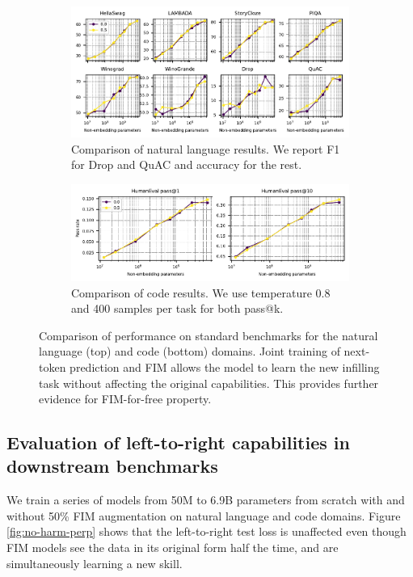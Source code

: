 \documentclass[postscript]{article}
\begin{document}
\begin{figure}[ht!]
\centering
\begin{subfigure}[b]{\textwidth}
\centering
\includegraphics[width=\textwidth]{figures/lang-downstream-eval.pdf}
\caption{Comparison of natural language results. We report F1 for Drop and QuAC and accuracy for the rest.}
\label{fig:no-harm-perf:lang}
\end{subfigure}
\begin{subfigure}[b]{\textwidth}
\centering
\includegraphics[width=\textwidth]{figures/human_eval_scaling_subf.pdf}
\caption{Comparison of code results. We use temperature 0.8 and 400 samples per task for both pass@k.}
\label{fig:no-harm-perf:code}
\end{subfigure}
\caption{Comparison of performance on standard benchmarks for the natural language (top) and code (bottom) domains. Joint training of next-token prediction and FIM allows the model to learn the new infilling task without affecting the original capabilities. This provides further evidence for FIM-for-free property.}
\label{fig:no-harm-perf}
\end{figure}
\subsection{Evaluation of left-to-right capabilities in downstream benchmarks}
\label{sec:pretraining:eval_left_to_right}
We train a series of models from 50M to 6.9B parameters  from scratch with and without 50\% FIM augmentation on natural language and code domains. Figure \ref{fig:no-harm-perp} shows that the left-to-right test loss is unaffected even though FIM models see the data in its original form half the time, and are simultaneously learning a new skill. 
\end{document}
